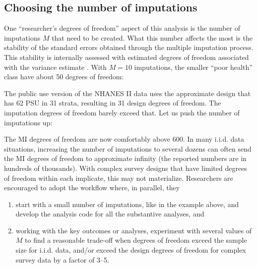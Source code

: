 \begin{stlog}
\nullskip
\end{stlog}

\subsection{Choosing the number of imputations}

One ``researcher's degrees of freedom'' aspect of this analysis
is the number of imputations $M$ that need to be created.
What this number affects the most is the stability of the standard
errors obtained through the multiple imputation process.
This stability is internally assessed with estimated
degrees of freedom associated with the variance estimate
\citep{barnard:rubin:1999}. With $M=10$ imputations,
the smaller ``poor health'' class have about 50 degrees of freedom:

\begin{stlog}
\nullskip
\end{stlog}

The public use version of the NHANES II data uses the approximate
design that has 62 PSU in 31 strata, resulting in 31 design degrees 
of freedom. The imputation degrees of freedom barely exceed that.
Let us push the number of imputations up:

\begin{stlog}
\nullskip
\end{stlog}

The MI degrees of freedom are now comfortably above 600.
In many i.i.d. data situations, increasing the number of imputations
to several dozens can often send the MI degrees of freedom to 
approximate infinity (the reported numbers are in hundreds 
of thousands). With complex survey designs that have limited
degrees of freedom within each implicate, this may not materialize.
Researchers are encouraged to adopt the workflow where, in parallel,
they

\begin{enumerate}
  \item start with a small number of imputations, like 
        in the example above, and develop the analysis code for all
        the substantive analyses, and
  \item working with the key outcomes or analyses, 
        experiment with several values of $M$ to find a reasonable
        trade-off when degrees of freedom exceed the sample size 
        for i.i.d. data, and/or exceed the design degrees of freedom
        for complex survey data by a factor of 3--5.
\end{enumerate}

